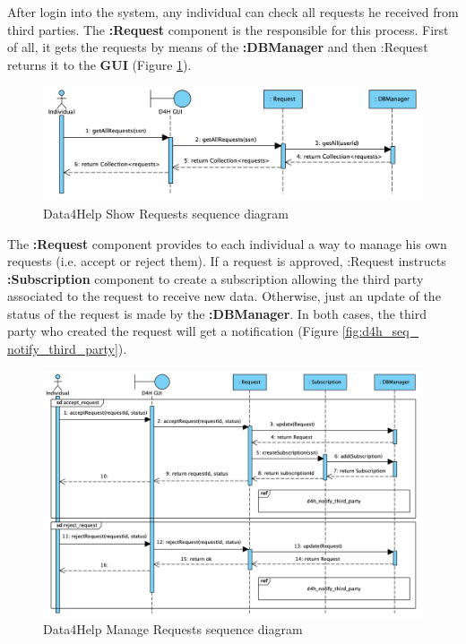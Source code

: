 \documentclass[a4paper, hidelinks, 12pt]{report}
\begin{document}
	After login into the system, any individual can check all requests he received from third parties. The \textbf{:Request} component is the responsible for this process. First of all, it gets the requests by means of the \textbf{:DBManager} and then :Request returns it to the \textbf{GUI} (Figure \ref{fig:d4h_seq_show_requests}). \\
	
	\begin{figure}[H]
		\centering
		\includegraphics[width=1\textwidth]{diagrams/sequence_diagrams/d4h_show_requests.png}
		\caption[Data4Help Show Requests sequence diagram]{Data4Help Show Requests sequence diagram}
		\label{fig:d4h_seq_show_requests}
	\end{figure}
	
	The \textbf{:Request} component provides to each individual a way to manage his own requests (i.e. accept or reject them). If a request is approved, :Request instructs \textbf{:Subscription} component to create a subscription allowing the third party associated to the request to receive new data. Otherwise, just an update of the status of the request is made by the \textbf{:DBManager}. In both cases, the third party who created the request will get a notification (Figure \ref{fig:d4h_seq_ notify_third_party}). \\
	
	\begin{figure}[H]
		\centering
		\includegraphics[width=1\textwidth]{diagrams/sequence_diagrams/d4h_manage_requests.png}
		\caption[Data4Help Manage Requests sequence diagram]{Data4Help Manage Requests sequence diagram}
		\label{fig:d4h_seq_manage_requests}
	\end{figure}
	
\end{document}
